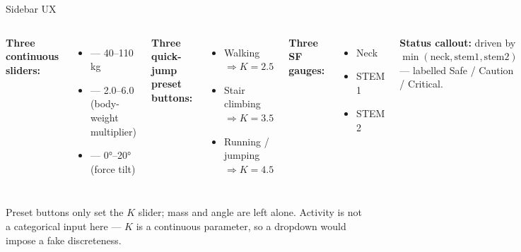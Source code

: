 \begin{frame}{Sidebar UX}
  \begin{columns}[T,onlytextwidth]
    \textbf{Three continuous sliders:}
    \begin{itemize}\small
      \item {} --- 40--110 kg
      \item {} --- 2.0--6.0 (body-weight multiplier)
      \item {} --- 0°--20° (force tilt)
    \end{itemize}
    \vspace{0.3cm}
    \textbf{Three quick-jump preset buttons:}
    \begin{itemize}\small
      \item Walking \(\Rightarrow K = 2.5\)
      \item Stair climbing \(\Rightarrow K = 3.5\)
      \item Running / jumping \(\Rightarrow K = 4.5\)
    \end{itemize}
    \textbf{Three SF gauges:}
    \begin{itemize}\small
      \item Neck
      \item STEM 1
      \item STEM 2
    \end{itemize}
    \vspace{0.3cm}
    \textbf{Status callout:}
    driven by \(\min(\text{neck}, \text{stem1}, \text{stem2})\) ---
    labelled Safe / Caution / Critical.
  \end{columns}

  \vspace{0.4cm}
  \footnotesize
  Preset buttons only set the \(K\) slider; mass and angle are left
  alone. Activity is not a categorical input here --- \(K\) is a
  continuous parameter, so a dropdown would impose a fake discreteness.
\end{frame}

